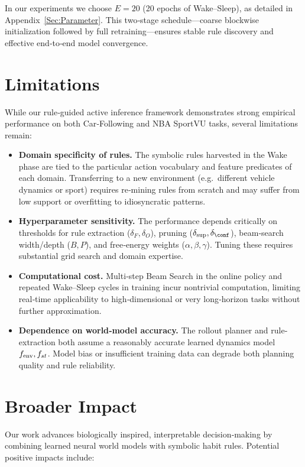 \documentclass{article} %
\begin{document}
In our experiments we choose $E=20$ (20 epochs of Wake–Sleep), as detailed in Appendix~\ref{Sec:Parameter}. This two‐stage schedule—coarse blockwise initialization followed by full retraining—ensures stable rule discovery and effective end‐to‐end model convergence.  

\section{Limitations}
\label{Sec:G}
While our rule‐guided active inference framework demonstrates strong empirical performance on both Car‐Following and NBA SportVU tasks, several limitations remain:

\begin{itemize}
  \item \textbf{Domain specificity of rules.}  The symbolic rules harvested in the Wake phase are tied to the particular action vocabulary and feature predicates of each domain.  Transferring to a new environment (e.g.\ different vehicle dynamics or sport) requires re‐mining rules from scratch and may suffer from low support or overfitting to idiosyncratic patterns.
  \item \textbf{Hyperparameter sensitivity.}  The performance depends critically on thresholds for rule extraction ($\delta_F,\delta_O$), pruning ($\delta_{\sup},\delta_{\conf}$), beam‐search width/depth ($B,P$), and free‐energy weights ($\alpha,\beta,\gamma$).  Tuning these requires substantial grid search and domain expertise.
  \item \textbf{Computational cost.}  Multi‐step Beam Search in the online policy and repeated Wake–Sleep cycles in training incur nontrivial computation, limiting real‐time applicability to high‐dimensional or very long‐horizon tasks without further approximation.
  \item \textbf{Dependence on world‐model accuracy.}  The rollout planner and rule‐extraction both assume a reasonably accurate learned dynamics model $f_{\rm env},f_{st}$.  Model bias or insufficient training data can degrade both planning quality and rule reliability.
\end{itemize}

\section{Broader Impact}
\label{Sec:H}
Our work advances biologically inspired, interpretable decision‐making by combining learned neural world models with symbolic habit rules.  Potential positive impacts include:
\end{document}
